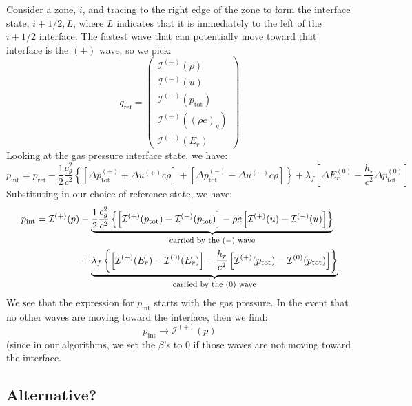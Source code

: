 \documentclass[12pt]{article}
\newcommand{\evm}{{(-)}}
\newcommand{\evz}{{(0)}}
\newcommand{\evp}{{(+)}}
\begin{document}
Consider a zone, $i$, and tracing to the right edge of the zone to
form the interface state, $i+1/2,L$, where $L$ indicates that it is
immediately to the left of the $i+1/2$ interface.  The fastest wave
that can potentially move toward that interface is the $\evp$ wave,
so we pick:
\begin{equation}
q_\mathrm{ref} = \left (
   \begin{array}{c}
     \mathcal{I}^\evp(\rho) \\
     \mathcal{I}^\evp(u) \\
     \mathcal{I}^\evp(p_\mathrm{tot}) \\
     \mathcal{I}^\evp((\rho e)_g) \\
     \mathcal{I}^\evp(E_r)
   \end{array}
\right )
\end{equation}
Looking at the gas pressure interface state, we have:
\begin{equation}
p_\mathrm{int} = p_\mathrm{ref} - \frac{1}{2} \frac{c_g^2}{c^2} \left \{
   \left [ \Delta p_\mathrm{tot}^\evp + \Delta u^\evp c\rho \right ]
 + \left [ \Delta p_\mathrm{tot}^\evm - \Delta u^\evm c\rho \right ] \right \}
 + \lambda_f \left [ \Delta E_r^\evz - \frac{h_r}{c^2} \Delta p^\evz_\mathrm{tot} \right ]
\end{equation}
Substituting in our choice of reference state, we have:
\begin{align}
p_\mathrm{int} = \mathcal{I}^\evp(p) &- \underbrace{\frac{1}{2} \frac{c_g^2}{c^2} \left \{
 \left [ \mathcal{I}^\evp(p_\mathrm{tot}) - \mathcal{I}^\evm(p_\mathrm{tot}) \right ] 
   - \rho c \left [ \mathcal{I}^\evp(u) - \mathcal{I}^\evm(u) \right ] \right \}}_{\mbox{\footnotesize carried by the $\evm$ wave}} \\
 &+ \underbrace{\lambda_f \left \{ \left [ \mathcal{I}^\evp(E_r) - \mathcal{I}^\evz(E_r) \right ]
   - \frac{h_r}{c^2} \left [ \mathcal{I}^\evp(p_\mathrm{tot}) - \mathcal{I}^\evz(p_\mathrm{tot}) \right ] \right \}}_{\mbox{\footnotesize carried by the $\evz$ wave}}
\end{align}
We see that the expression for
$p_\mathrm{int}$ starts with the gas pressure.  In the 
event that no other waves are moving toward the interface, then we find:
\begin{equation}
p_\mathrm{int} \rightarrow \mathcal{I}^\evp(p)
\end{equation}
(since in our algorithms, we set the $\beta$'s to $0$ if those waves
are not moving toward the interface.

\subsection*{Alternative?}
\end{document}
